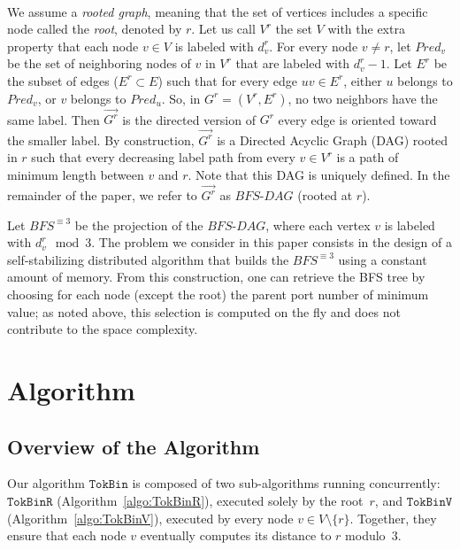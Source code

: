 \documentclass[a4paper, 12pt]{article}
\newcommand{\monparagraph}[1]{\smallskip\noindent{\bf #1}\ }
\begin{document}
\monparagraph{Problem to be solved.}

We assume a \textit{rooted graph}, meaning that the set of vertices includes a specific node called the \textit{root}, denoted by $r$.
Let us call $V^r$ the set $V$ with the extra property that each node $v \in V$ is labeled with $d^r_v$. 
%
For every node $v \neq r$, let $Pred_v$ be the
set of neighboring nodes of $v$ in $V^r$ that are labeled with $d^r_v - 1$.  
Let $E^r$ be the subset of edges ($E^r \subset E$) such that for every edge $uv \in E^r$, either $u$ belongs to $Pred_v$, or $v$ belongs to $Pred_u$.
So, in $G^r=(V^r,E^r)$, no two neighbors have the same label. 
Then $\overrightarrow{G^r}$ is the directed version of $G^r$ every edge is oriented toward the smaller label. 
By construction, $\overrightarrow{G^r}$ is a Directed Acyclic Graph (DAG) rooted in $r$ such that every decreasing label path from every $v \in V^r$ is a path of minimum length between $v$ and $r$. Note that this DAG is uniquely defined. In the remainder of the paper, we refer to $\overrightarrow{G^r}$ as $BFS\mbox{-}DAG$ (rooted at $r$).  

Let $BFS^{\equiv 3}$ be the projection of the $BFS\mbox{-}DAG$, where each vertex $v$ is labeled with $d^r_v \mod 3$.
The problem we consider in this paper consists in the design of a self-stabilizing distributed algorithm that builds the $BFS^{\equiv 3}$ using a constant amount of memory. From this construction, one can retrieve the BFS tree by choosing for each node (except the root) the parent port number of minimum value; as noted above, this selection is 
computed on the fly and does not contribute to the space complexity. 

\section{Algorithm}
\subsection{Overview of the Algorithm}
\label{subsec:overview}

Our algorithm $\mathtt{TokBin}$ is composed of two sub-algorithms 
running concurrently: $\mathtt{TokBinR}$ (Algorithm~\ref{algo:TokBinR}), 
executed solely by the root~$r$, and $\mathtt{TokBinV}$ 
(Algorithm~\ref{algo:TokBinV}), executed by every node 
$v \in V \setminus \{r\}$. Together, they ensure that each node $v$ 
eventually computes its distance to $r$ modulo~$3$.
\end{document}
